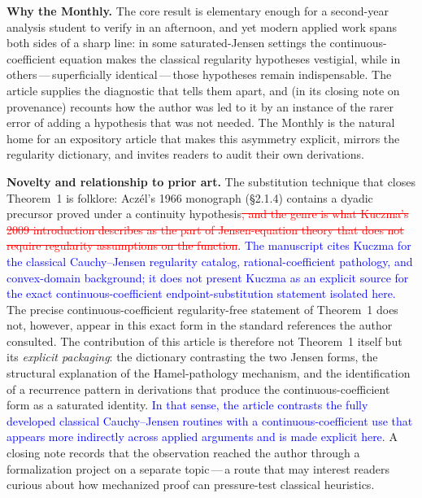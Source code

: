 \documentclass[12pt]{article}
\newcommand{\ReviewAdd}[1]{\textcolor{blue}{#1}}
\newcommand{\ReviewDel}[1]{\textcolor{red}{\sout{#1}}}
\begin{document}
\bigskip
\noindent\textbf{Why the Monthly.}
The core result is elementary enough for a second-year analysis student
to verify in an afternoon, and yet modern applied work spans both
sides of a sharp line: in some saturated-Jensen settings the
continuous-coefficient equation makes the classical regularity
hypotheses vestigial, while in others\,---\,superficially
identical\,---\,those hypotheses remain indispensable. The article
supplies the diagnostic that tells them apart, and (in its closing
note on provenance) recounts how the author was led to it by an
instance of the rarer error of adding a hypothesis that was not
needed. The Monthly is the natural home for an expository article that
makes this asymmetry explicit, mirrors the regularity dictionary, and
invites readers to audit their own derivations.

\bigskip
\noindent\textbf{Novelty and relationship to prior art.}
The substitution technique that closes Theorem~1 is folklore:
Acz\'{e}l's 1966 monograph (\S2.1.4) contains a dyadic precursor proved
under a continuity hypothesis\ReviewDel{, and the genre is what Kuczma's 2009
introduction describes as the part of Jensen-equation theory that does
not require regularity assumptions on the function}. \ReviewAdd{The manuscript cites Kuczma for the classical Cauchy--Jensen regularity catalog, rational-coefficient pathology, and convex-domain background; it does not present Kuczma as an explicit source for the exact continuous-coefficient endpoint-substitution statement isolated here.} The precise
continuous-coefficient regularity-free statement of Theorem~1 does
not, however, appear in this exact form in the standard references the
author consulted. The contribution of this article is therefore not
Theorem~1 itself but its \emph{explicit packaging}: the dictionary
contrasting the two Jensen forms, the structural explanation of the
Hamel-pathology mechanism, and the identification of a recurrence
pattern in derivations that produce the continuous-coefficient form as
a saturated identity. \ReviewAdd{In that sense, the article contrasts the fully developed classical Cauchy--Jensen routines with a continuous-coefficient use that appears more indirectly across applied arguments and is made explicit here.} A closing note records that the observation
reached the author through a formalization project on a separate
topic\,---\,a route that may interest readers curious about how
mechanized proof can pressure-test classical heuristics.
\end{document}
